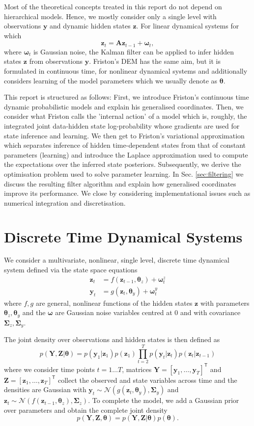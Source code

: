 \documentclass[a4paper,10pt]{article}
\newcommand{\bs}[1]{\mathbf{#1}}					%
\newcommand{\bgs}[1]{\boldsymbol{#1}}				%
\newcommand{\tr}{\mathsf{T}}				%
\newcommand{\eq}[1]{\begin{equation} #1 \end{equation}}%
\renewcommand{\ss}{z}         %
\newcommand{\so}{y}         %
\newcommand{\sn}{\omega} %
\renewcommand{\sp}{\theta}    %
\newcommand{\ps}{\bs{\ss}}    %
\newcommand{\po}{\bs{\so}}    %
\newcommand{\pn}{\bgs{\sn}} %
\newcommand{\pp}{\bgs{\sp}} %
\newcommand{\Ps}{\bs{Z}}    %
\newcommand{\Po}{\bs{Y}}    %
\newcommand{\N}{\mathcal{N}}			%
\newcommand{\Cov}{\bgs{\Sigma}}			%
\begin{document}
Most of the theoretical concepts treated in this report do not depend on hierarchical models. Hence, we mostly consider only a single level with observations $\po$ and dynamic hidden states $\ps$. For linear dynamical systems for which
\eq{
    \ps_t = \bs{A}\ps_{t-1} + \pn_{t},
}
where $\pn_{t}$ is Gaussian noise, the Kalman filter can be applied to infer hidden states $\ps$ from observations $\po$. Friston's DEM has the same aim, but it is formulated in continuous time, for nonlinear dynamical systems and additionally considers learning of the model parameters which we usually denote as $\pp$.

This report is structured as follows: First, we introduce Friston's continuous time dynamic probabilistic models and explain his generalised coordinates. Then, we consider what Friston calls the 'internal action' of a model which is, roughly, the integrated joint data-hidden state log-probability whose gradients are used for state inference and learning. We then get to Friston's variational approximation which separates inference of hidden time-dependent states from that of constant parameters (learning) and introduce the Laplace approximation used to compute the expectations over the inferred state posteriors. Subsequently, we derive the optimisation problem used to solve parameter learning. In Sec. \ref{sec:filtering} we discuss the resulting filter algorithm and explain how generalised coordinates improve its performance. We close by considering implementational issues such as numerical integration and discretisation.


\section{Discrete Time Dynamical Systems}
We consider a multivariate, nonlinear, single level, discrete time dynamical system defined via the state space equations
\begin{align}
    \label{eq:linmodel_dyn}\ps_t &= f(\ps_{t-1}, \pp_{\ss}) + \pn_t^{\ss}\\
    \label{eq:linmodel_obs}\po_t &= g(\ps_t, \pp_{\so}) + \pn_t^{\so}
\end{align}
where $f, g$ are general, nonlinear functions of the hidden states $\ps$ with parameters $\pp_{\ss}, \pp_{\so}$ and the $\pn$ are Gaussian noise variables centred at 0 and with covariance $\Cov_{\ss}, \Cov_{\so}$.

The joint density over observations and hidden states is then defined as
\eq{
    p(\Po,\Ps|\pp) = p(\po_1|\ps_1)p(\ps_1)\prod_{t=2}^T p(\po_t|\ps_t)p(\ps_t|\ps_{t-1})
}
where we consider time points $t=1\dots T$, matrices $\Po = [\po_1, \dots, \po_T]^\tr$ and $\Ps = [\ps_1, \dots, \ps_T]^\tr$ collect the observed and state variables across time and the densities are Gaussian with $\po_t \sim \N(g(\ps_t, \pp_{\so}), \Cov_{\so})$ and $\ps_t \sim \N(f(\ps_{t-1}, \pp_{\ss}), \Cov_{\ss})$. To complete the model, we add a Gaussian prior over parameters and obtain the complete joint density
\eq{
    p(\Po,\Ps,\pp) = p(\Po,\Ps|\pp)p(\pp).
}
\end{document}
